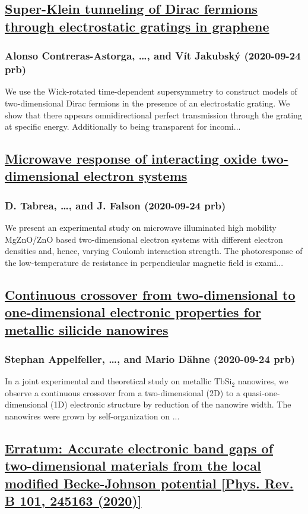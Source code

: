 \subsection*{\href{http://link.aps.org/doi/10.1103/PhysRevB.102.115429}{Super-Klein tunneling of Dirac fermions through electrostatic gratings in graphene}}
\subsubsection*{Alonso Contreras-Astorga, \dots, and Vít Jakubský (2020-09-24 prb)}
We use the Wick-rotated time-dependent supersymmetry to construct models of two-dimensional Dirac fermions in the presence of an electrostatic grating. We show that there appears omnidirectional perfect transmission through the grating at specific energy. Additionally to being transparent for incomi...
\subsection*{\href{http://link.aps.org/doi/10.1103/PhysRevB.102.115432}{Microwave response of interacting oxide two-dimensional electron systems}}
\subsubsection*{D. Tabrea, \dots, and J. Falson (2020-09-24 prb)}
We present an experimental study on microwave illuminated high mobility MgZnO/ZnO based two-dimensional electron systems with different electron densities and, hence, varying Coulomb interaction strength. The photoresponse of the low-temperature dc resistance in perpendicular magnetic field is exami...
\subsection*{\href{http://link.aps.org/doi/10.1103/PhysRevB.102.115433}{Continuous crossover from two-dimensional to one-dimensional electronic properties for metallic silicide nanowires}}
\subsubsection*{Stephan Appelfeller, \dots, and Mario Dähne (2020-09-24 prb)}
In a joint experimental and theoretical study on metallic $\mathrm{Tb}{\mathrm{Si}}_{2}$ nanowires, we observe a continuous crossover from a two-dimensional (2D) to a quasi-one-dimensional (1D) electronic structure by reduction of the nanowire width. The nanowires were grown by self-organization on ...
\subsection*{\href{http://link.aps.org/doi/10.1103/PhysRevB.102.119902}{Erratum: Accurate electronic band gaps of two-dimensional materials from the local modified Becke-Johnson potential [Phys. Rev. B 101, 245163 (2020)]}}
